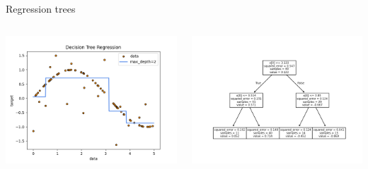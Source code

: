 \documentclass{irdbeamer}
\begin{document}
\begin{frame}{Regression trees}
\begin{columns}
    \begin{column}[t]{0.5\textwidth}
\centering
    \includegraphics[width=\textwidth]{./figs/regression.png}%
\end{column}
    \begin{column}[t]{0.5\textwidth}
\centering
    \includegraphics[width=\textwidth]{./figs/regression_tree.png}%
\end{column}
\end{columns}
\end{frame}
\end{document}
